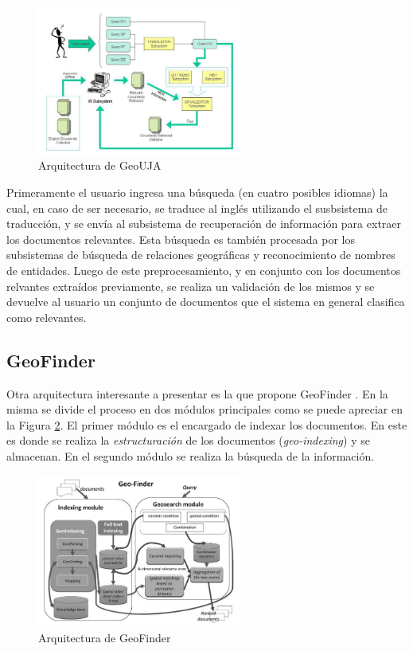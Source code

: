 \documentclass{llncs}
\begin{document}
\begin{figure}[htb]%
	\begin{center}
		\includegraphics[width=0.6\textwidth]{geouja_arch.jpg}
	\end{center}
	\caption{Arquitectura de GeoUJA \cite{perea2007}}
	\label{fig:archgeouja}
\end{figure}

Primeramente el usuario ingresa una búsqueda (en cuatro posibles idiomas) la
cual, en caso de ser necesario, se traduce al inglés utilizando el susbsistema
de traducción, y se envía al subsistema de recuperación de información para
extraer los documentos relevantes. Esta búsqueda es también procesada por los
subsistemas de búsqueda de relaciones geográficas y reconocimiento de nombres de
entidades. Luego de este preprocesamiento, y en conjunto con los documentos
relvantes extraídos previamente, se realiza un validación de los mismos y se
devuelve al usuario un conjunto de documentos que el sistema en general
clasifica como relevantes.

\subsection{GeoFinder}\label{sec:archgeofinder}

Otra arquitectura interesante a presentar es la que propone GeoFinder
\cite{bordogna2012}. En la misma se divide el proceso en dos módulos principales
como se puede apreciar en la Figura \ref{fig:archgeofinder}. El primer módulo es
el encargado de indexar los documentos. En este es donde se realiza la
\emph{estructuración} de los documentos (\emph{geo-indexing}) y se almacenan.
En el segundo módulo se realiza la búsqueda de la información.

\begin{figure}[htb]%
	\begin{center}
		\includegraphics[width=0.6\textwidth]{geofinder_arch.jpg}
	\end{center}
	\caption{Arquitectura de GeoFinder \cite{bordogna2012}}
	\label{fig:archgeofinder}
\end{figure}
\end{document}
